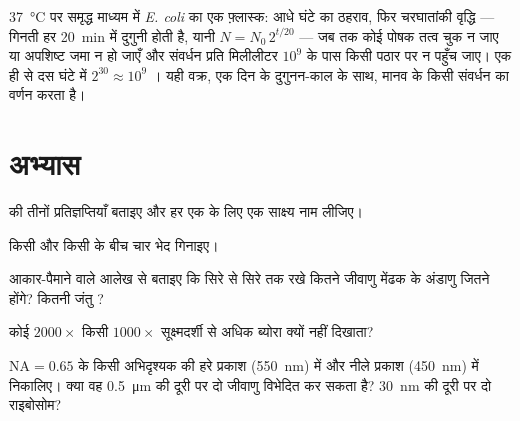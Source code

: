 \begin{example}[एक वृद्धि वक्र]\label{ex:b1:cell-unit-of-life:growthcurve}
\qty{37}{\celsius} पर समृद्ध माध्यम में \emph{E. coli} का एक फ़्लास्क:
आधे घंटे का ठहराव, फिर चरघातांकी वृद्धि --- गिनती हर \qty{20}{min} में
दुगुनी होती है, यानी $N = N_0\,2^{t/20}$ --- जब तक कोई पोषक तत्व चुक न
जाए या अपशिष्ट जमा न हो जाएँ और संवर्धन प्रति मिलीलीटर $10^9$ 
के पास किसी पठार पर न पहुँच जाए। एक ही  से दस घंटे में
$2^{30} \approx 10^9$ । यही वक्र, एक दिन के दुगुनन-काल के साथ,
मानव  के किसी संवर्धन का वर्णन करता है।
\end{example}

\section{अभ्यास}

\begin{exercise}[$\star$]\label{exo:b1:cell-unit-of-life:1}
 की तीनों प्रतिज्ञप्तियाँ बताइए और हर एक के लिए एक
साक्ष्य नाम लीजिए।
\end{exercise}

\begin{exercise}[$\star$]\label{exo:b1:cell-unit-of-life:2}
किसी  और किसी  के बीच चार भेद गिनाइए।
\end{exercise}

\begin{exercise}[$\star$]\label{exo:b1:cell-unit-of-life:3}
आकार-पैमाने वाले आलेख से बताइए कि सिरे से सिरे तक रखे कितने जीवाणु मेंढक
के अंडाणु जितने होंगे? कितनी जंतु ?
\end{exercise}

\begin{exercise}[$\star$]\label{exo:b1:cell-unit-of-life:4}
कोई $2000\times$  किसी $1000\times$ सूक्ष्मदर्शी से
अधिक ब्योरा क्यों नहीं दिखाता?
\end{exercise}

\begin{exercise}[$\star\star$]\label{exo:b1:cell-unit-of-life:5}
$\mathrm{NA} = 0.65$ के किसी अभिदृश्यक की  हरे प्रकाश
(\qty{550}{nm}) में और नीले प्रकाश (\qty{450}{nm}) में निकालिए। क्या वह
\qty{0.5}{\micro m} की दूरी पर दो जीवाणु विभेदित कर सकता है?
\qty{30}{nm} की दूरी पर दो राइबोसोम?
\end{exercise}

